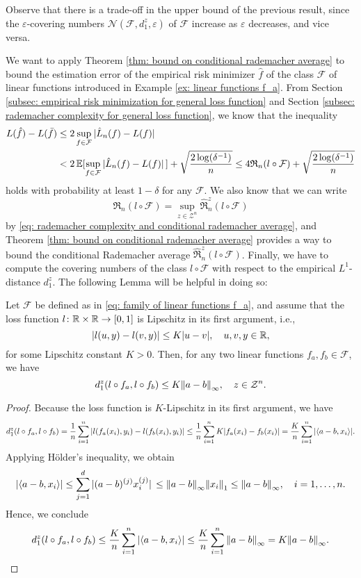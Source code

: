 Observe that there is a trade-off in the upper bound of the previous result, since the $\varepsilon$-covering numbers $\mathcal{N}(\mathcal{F}, d_1^z, \varepsilon)$ of $\mathcal{F}$ increase as $\varepsilon$ decreases, and vice versa. 

We want to apply Theorem \ref{thm: bound on conditional rademacher average} to bound the estimation error of the empirical risk minimizer $\hat{f}$ of the class $\mathcal{F}$ of linear functions introduced in Example \ref{ex: linear functions f_a}. From Section \ref{subsec: empirical risk minimization for general loss function} and Section \ref{subsec: rademacher complexity for general loss function}, we know that the inequality
\begin{align*}
    L(\hat{f}) - L(\bar{f}) &\leq 2 \sup_{f \in \mathcal{F}} \abs*{\hat{L}_n(f) - L(f)} \\
    &< 2 \operatorname{\mathbb{E}}[\sup_{f \in \mathcal{F}} \abs*{\hat L_n(f) - L(f)}] + \sqrt{\frac{2 \log(\delta^{-1})}{n}} \leq 4 \mathfrak{R}_n(l \circ \mathcal{F}) + \sqrt{\frac{2 \log(\delta^{-1})}{n}}
\end{align*}
holds with probability at least $1 - \delta$ for any $\mathcal{F}$. We also know that we can write
\[
    \mathfrak{R}_n(l \circ \mathcal{F}) = \sup_{z \in \mathcal{Z}^n} \hat{\mathfrak{R}}_n^z(l \circ \mathcal{F})
\]
by \eqref{eq: rademacher complexity and conditional rademacher average}, and Theorem \ref{thm: bound on conditional rademacher average} provides a way to bound the conditional Rademacher average $\hat{\mathfrak{R}}_n^z(l \circ \mathcal{F})$. Finally, we have to compute the covering numbers of the class $l \circ \mathcal{F}$ with respect to the empirical $L^1$-distance $d_1^z$. The following Lemma will be helpful in doing so:

\begin{lemma}
\label{lem: distance between linear functions f_a}
Let $\mathcal{F}$ be defined as in \eqref{eq: family of linear functions f_a}, and assume that the loss function $l \colon \mathbb{R} \times \mathbb{R} \to [0, 1]$ is Lipschitz in its first argument, i.e.,
\[
    \abs{l(u, y) - l(v, y)} \leq K \abs{u - v}, \quad u, v, y \in \mathbb{R},
\]
for some Lipschitz constant $K > 0$. Then, for any two linear functions $f_a, f_b \in \mathcal{F}$, we have
\[
    d_1^z(l \circ f_a, l \circ f_b) \leq K \norm{a - b}_{\infty}, \quad z \in \mathcal{Z}^n.
\]
\end{lemma}

\begin{proof}
Because the loss function is $K$-Lipschitz in its first argument, we have
\[
    d_1^z(l \circ f_a, l \circ f_b) = \frac{1}{n} \sum_{i=1}^n \abs{l(f_a(x_i), y_i) - l(f_b(x_i), y_i)} \leq \frac{1}{n} \sum_{i=1}^n K \abs{f_a(x_i) - f_b(x_i)} = \frac{K}{n} \sum_{i=1}^n \abs{\langle a - b, x_i \rangle}.
\]
Applying H{\"o}lder's inequality, we obtain
\[
    \abs{\langle a - b, x_i \rangle} \leq \sum_{j=1}^d \abs*{(a - b)^{(j)} x_i^{(j)}} \leq \norm{a - b}_{\infty} \norm{x_i}_1 \leq \norm{a - b}_{\infty}, \quad i = 1, \dots, n.
\]
Hence, we conclude
\[
    d_1^z(l \circ f_a, l \circ f_b) \leq \frac{K}{n} \sum_{i=1}^n \abs{\langle a - b, x_i \rangle} \leq \frac{K}{n} \sum_{i=1}^n \norm{a - b}_{\infty} = K \norm{a - b}_{\infty}. \qedhere
\]
\end{proof}

